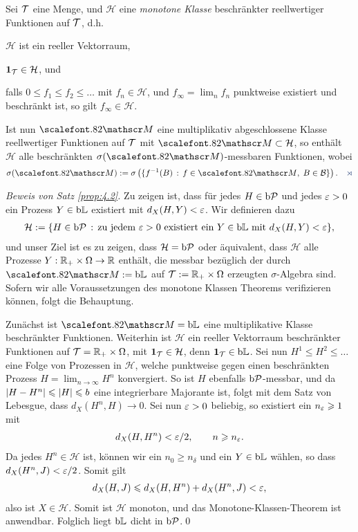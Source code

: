 \begin{prop*}
Sei $\mathcal{T}$ eine Menge, und $\mathcal{H}$ eine \emph{monotone Klasse}
beschränkter reellwertiger Funktionen auf $\mathcal{T}$, d.h.
\begin{defnenum}
\item $\mathcal{H}$ ist ein reeller Vektorraum,
\item $\mathbf{1}_{\mathcal{T}}\in\mathcal{H}$, und
\item falls $0\le f_1\le f_2\le \ldots$ mit $f_n\in\mathcal{H}$, und
$f_\infty=\lim_n f_n$ punktweise existiert und beschränkt ist, so gilt
$f_\infty\in\mathcal{H}$.
\end{defnenum}
Ist nun $\MM$ eine multiplikativ abgeschlossene Klasse reellwertiger
Funktionen auf $\mathcal{T}$ mit $\MM \subset \mathcal{H}$, so enthält $\mathcal{H}$
alle beschränkten $\sigma(\MM)$-messbaren Funktionen, wobei
\begin{align*}
\sigma(\MM) \defl \sigma\left(\setdef{f^{-1}(B)}{f\in\MM,\;
B\in\BB}\right).\fish
\end{align*}
\end{prop*}

\begin{proof}[Beweis von Satz \ref{prop:4.2}]
Zu zeigen ist, dass für jedes $H\in\mathrm{b}\mathcal{P}$ und jedes $\varepsilon > 0$ ein Prozess
$Y\in\mathrm{b}\mathbb{L}$ existiert mit $d_X(H,Y) < \varepsilon$. Wir definieren dazu
\begin{align*}
\mathcal{H} \defl \setdef{H\in\bPP}{\text{zu jedem }\ep > 0\text{ existiert ein
}Y\in\bL\text{ mit }d_X(H,Y) < \ep},
\end{align*}
und unser Ziel ist es zu zeigen, dass $\mathcal{H}=\mathrm{b}\mathcal{P}$ oder äquivalent,
dass $\mathcal{H}$ alle Prozesse $Y: \mathbb{R}_+\times \Omega\to\mathbb{R}$ enthält,
die messbar bezüglich der durch $\MM\defl\bL$ auf $\mathcal{T}:=\mathbb{R}_+\times \Omega$
erzeugten $\sigma$-Algebra sind. Sofern wir alle Voraussetzungen des monotone Klassen
Theorems verifizieren können, folgt die Behauptung.

Zunächst ist $\MM=\bL$ eine multiplikative Klasse beschränkter Funktionen.
Weiterhin ist $\mathcal{H}$ ein reeller Vektorraum beschränkter Funktionen auf
$\mathcal{T}=\mathbb{R}_+\times \Omega$, mit $\mathbf{1}_{\mathcal{T}}\in\mathcal{H}$, denn $\mathbf{1}_{\mathcal{T}}\in\mathrm{b}\mathbb{L}$. Sei
nun $H^1\le H^2 \le \ldots$ eine Folge von Prozessen in $\mathcal{H}$, welche
punktweise gegen einen beschränkten Prozess $H=\lim_{n\to \infty} H^n$
konvergiert. So ist $H$ ebenfalls $\mathrm{b}\mathcal{P}$-messbar, und da $\lvert H-H^n\rvert \leqslant
\lvert H\rvert\leqslant b$ eine integrierbare Majorante ist, folgt mit dem Satz von Lebesgue,
dass $d_X(H^n,H) \to 0$. 
Sei nun $\varepsilon > 0$ beliebig, so existiert ein $n_\varepsilon \geqslant 1$ mit
\begin{align*}
d_X(H,H^n) < \varepsilon/2,\qquad n\geqslant n_\varepsilon.
\end{align*}
Da jedes $H^n\in\mathcal{H}$ ist, können wir ein $n_0 \ge
n_\delta$ und ein $Y\in\mathrm{b}\mathbb{L}$ wählen, so dass $d_X(H^n,J) < \varepsilon/2$. Somit gilt
\begin{align*}
d_X(H,J) \leqslant d_X(H,H^n) + d_X(H^n,J) < \varepsilon,
\end{align*}
also ist $X\in\mathcal{H}$. Somit ist $\mathcal{H}$ monoton, und das
Monotone-Klassen-Theorem ist anwendbar. Folglich liegt $\mathrm{b}\mathbb{L}$ dicht in
$\mathrm{b}\mathcal{P}$.\qed
\end{proof}


